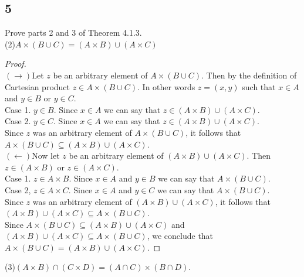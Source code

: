 \documentclass{article}
\begin{document}
\subsection{5}
Prove parts 2 and 3 of Theorem 4.1.3.
\\
(2)$A \times (B \cup C) = (A \times B) \cup (A \times C)$
\begin{proof}$ $\\
$(\rightarrow)$Let $z$ be an arbitrary element of $A \times(B \cup C)$. Then by the definition of Cartesian product $z \in A \times(B \cup C)$. In other words $z=(x,y)$ such that $x \in A$ and $y \in B$ or $y \in C$.\\
Case 1. $y \in B$. Since $x \in A$ we can say that $z \in (A \times B)\cup (A \times C)$.\\
Case 2. $y \in C$. Since $x \in A$ we can say that $z \in (A \times B)\cup (A \times C)$.\\
Since $z$ was an arbitrary element of $A \times (B \cup C)$, it follows that  $ A \times (B \cup C)\subseteq(A \times B) \cup(A \times C)$.$ $\\
$ $\\
$(\leftarrow)$Now let $z$ be an arbitrary element of $(A \times B) \cup (A \times C)$. Then $z \in (A \times B)$ or $z \in (A \times C)$.\\
Case 1. $z \in A \times B$. Since $x \in A$ and $y \in B$ we can say that $A \times (B \cup C)$.\\
Case 2, $z \in A \times C$. Since $x \in A$ and $y \in C$ we can say that $A \times (B \cup C)$.\\
Since $z$ was an arbitrary element of $(A \times B)\cup (A \times C)$, it follows that $(A \times B)\cup (A \times C) \subseteq A \times (B \cup C)$.$ $\\

Since  $ A \times (B \cup C)\subseteq(A \times B) \cup(A \times C)$ and $(A \times B)\cup (A \times C) \subseteq A \times (B \cup C)$, we conclude that $A \times (B \cup C) = (A \times B) \cup (A \times C)$.
\end{proof}$ $\\
(3)$(A \times B) \cap (C \times D)=(A \cap C)\times (B \cap D)$.
\end{document}
